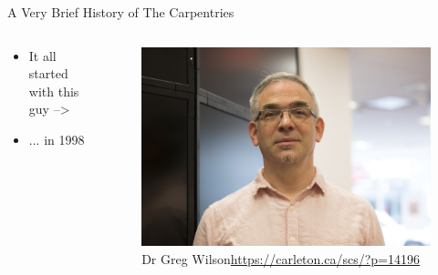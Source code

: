\begin{frame}{A Very Brief History of The Carpentries}
	\begin{columns}[T]
		\begin{column}[c]{.5\textwidth}
			\begin{itemize}
				\item It all started with this guy -->
				\item ... in 1998
			\end{itemize}
		\end{column}

		\begin{column}[c]{.5\textwidth}
			\begin{figure}
				\centering
				\includegraphics[width=.9\textwidth]{images/dr_greg_wilson.jpg} \linebreak
				\caption*{Dr Greg Wilson\linebreak\tiny\url{https://carleton.ca/scs/?p=14196}}
			\end{figure}
		\end{column}
	\end{columns}
	
\end{frame}

